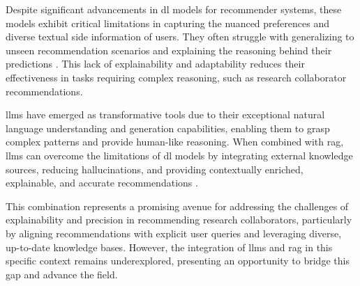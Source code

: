 Despite significant advancements in \gls{dl} models for recommender systems, these models exhibit critical limitations in capturing the nuanced preferences and diverse textual side information of users.
They often struggle with generalizing to unseen recommendation scenarios and explaining the reasoning behind their predictions \cite{Zhao2024}.
This lack of explainability and adaptability reduces their effectiveness in tasks requiring complex reasoning, such as research collaborator recommendations.

\glspl{llm} have emerged as transformative tools due to their exceptional natural language understanding and generation capabilities, enabling them to grasp complex patterns and provide human-like reasoning.
When combined with \gls{rag}, \glspl{llm} can overcome the limitations of \gls{dl} models by integrating external knowledge sources, reducing hallucinations, and providing contextually enriched, explainable, and accurate recommendations \cite{Deldjoo2024}.

This combination represents a promising avenue for addressing the challenges of explainability and precision in recommending research collaborators, particularly by aligning recommendations with explicit user queries and leveraging diverse, up-to-date knowledge bases.
However, the integration of \glspl{llm} and \gls{rag} in this specific context remains underexplored, presenting an opportunity to bridge this gap and advance the field.